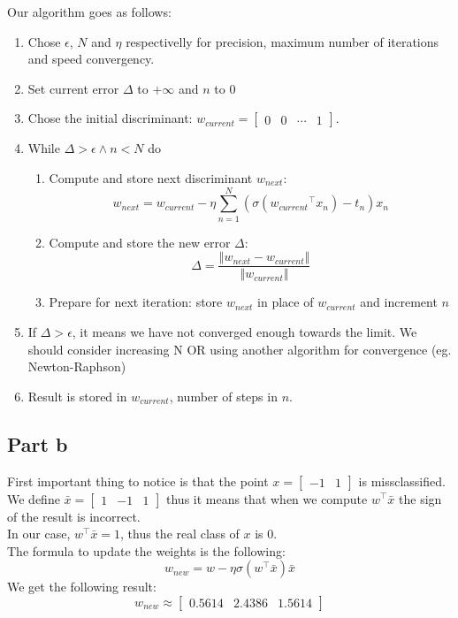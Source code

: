 \documentclass[a4paper, 10pt]{article}
\begin{document}
Our algorithm goes as follows:
\begin{enumerate}
    \item Chose $\epsilon$, $N$ and $\eta$ respectivelly for precision, maximum number of iterations and speed convergency.
    \item Set current error $\Delta$ to $+\infty$ and $n$ to $0$
    \item Chose the initial discriminant: $w_{current} = \begin{bmatrix}0 & 0 & \cdots & 1\end{bmatrix}$.
    \item While $\Delta > \epsilon \wedge n < N$ do
    \begin{enumerate}
        \item Compute and store next discriminant $w_{next}$:
$$
w_{next} = w_{current} - \eta \sum_{n=1}^{N}\left(\sigma({w_{current}}^\top x_n)-t_n\right)x_n
$$
        \item Compute and store the new error $\Delta$:
$$
\Delta = \frac{\left\Vert w_{next} - w_{current}\right\Vert}{\left\Vert w_{current} \right\Vert}
$$
        \item Prepare for next iteration: store $w_{next}$ in place of $w_{current}$ and increment $n$
    \end{enumerate}
    \item If $\Delta > \epsilon$, it means we have not converged enough towards the limit. We should consider increasing N OR using another algorithm for convergence (eg. Newton-Raphson)
    \item Result is stored in $w_{current}$, number of steps in $n$. 
\end{enumerate}

\subsection{Part b}
First important thing to notice is that the point $x=\begin{bmatrix}-1 & 1\end{bmatrix}$ is missclassified.
We define $\bar{x} = \begin{bmatrix}1 & -1 & 1\end{bmatrix}$ thus it means that when we compute 
$w^\top \bar{x}$ the sign of the result is incorrect.
\\
In our case, $w^\top \bar{x} = 1$, thus the real class of $x$ is $0$.
\\
The formula to update the weights is the following:
$$
w_{new} = w - \eta \sigma(w^\top \bar{x})\bar{x}
$$
We get the following result:
$$
w_{new} \approx \begin{bmatrix}0.5614 & 2.4386 & 1.5614\end{bmatrix}
$$
\end{document}
